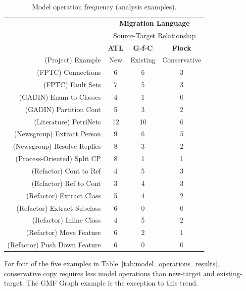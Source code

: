 \begin{table}
	\centering
	\begin{tabular}{|r|c|c|c|}
		\hline
		                              & \multicolumn{3}{|c|}{\textbf{Migration Language}} \\
													  			& \multicolumn{3}{|c|}{Source-Target Relationship} \\
		\hline
		                              & \textbf{ATL} & \textbf{G-f-C} & \textbf{Flock} \\
		(Project) Example             & New & Existing & Conservative \\
		\hline
		\hline
		(FPTC) Connections            & 6  & 6   & 3  \\
		\hline
		(FPTC) Fault Sets             & 7  & 5   & 3  \\
		\hline
		(GADIN) Enum to Classes       & 4  & 1   & 0  \\
		\hline
		(GADIN) Partition Cont        & 5  & 3   & 2  \\
		\hline
		(Literature) PetriNets        & 12  & 10   & 6  \\
		\hline
		(Newsgroup) Extract Person    & 9  & 6   & 5  \\
		\hline
		(Newsgroup) Resolve Replies   & 8  & 3   & 2  \\
		\hline
		(Process-Oriented) Split CP   & 8  & 1   & 1  \\
		\hline
		(Refactor) Cont to Ref        & 4  & 5   & 3  \\
		\hline
		(Refactor) Ref to Cont        & 3  & 4   & 3  \\
		\hline
		(Refactor) Extract Class      & 5  & 4   & 2  \\
		\hline
		(Refactor) Extract Subclass   & 6  & 0   & 0  \\
		\hline
		(Refactor) Inline Class       & 4  & 5   & 2  \\
		\hline
		(Refactor) Move Feature       & 6  & 2   & 1  \\
		\hline
		(Refactor) Push Down Feature  & 6  & 0 & 0  \\
		\hline
	\end{tabular}
	\caption{Model operation frequency (analysis examples).}
	\label{tab:model_operations_results_analysis_examples}
\end{table}

For four of the five examples in Table~\ref{tab:model_operations_results}, conservative copy requires less model operations than new-target and existing-target. The GMF Graph example is the exception to this trend.

